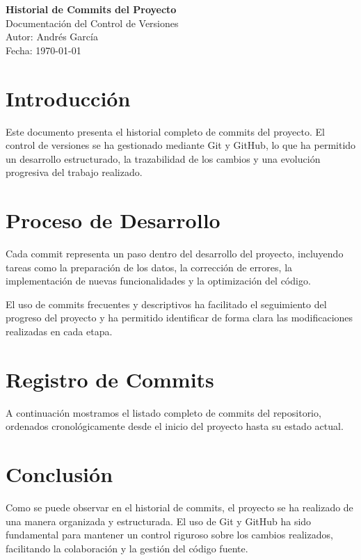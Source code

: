 \documentclass[12pt]{article}
\begin{document}
\begin{center}
    {\LARGE \textbf{Historial de Commits del Proyecto}}\\[0.5cm]
    {\large Documentación del Control de Versiones}\\[0.2cm]
    {\large Autor: Andrés García}\\
    {\large Fecha: \today}
\end{center}

\vspace{1cm}

\section{Introducción}
Este documento presenta el historial completo de commits del proyecto.
El control de versiones se ha gestionado mediante Git y GitHub, lo que ha
permitido un desarrollo estructurado, la trazabilidad de los cambios y
una evolución progresiva del trabajo realizado.

\section{Proceso de Desarrollo}
Cada commit representa un paso dentro del desarrollo del
proyecto, incluyendo tareas como la preparación de los datos, la corrección
de errores, la implementación de nuevas funcionalidades y la optimización
del código.

El uso de commits frecuentes y descriptivos ha facilitado el seguimiento
del progreso del proyecto y ha permitido identificar de forma clara las
modificaciones realizadas en cada etapa.

\section{Registro de Commits}
A continuación mostramos el listado completo de commits del repositorio,
ordenados cronológicamente desde el inicio del proyecto hasta su estado
actual.

\lstset{style=commitstyle}


\section{Conclusión}
Como se puede observar en el historial de commits, el proyecto se ha realizado de una manera organizada y estructurada.
El uso de Git y GitHub ha sido fundamental para mantener un control riguroso sobre los cambios realizados, facilitando la colaboración y la gestión del código fuente.
\end{document}
